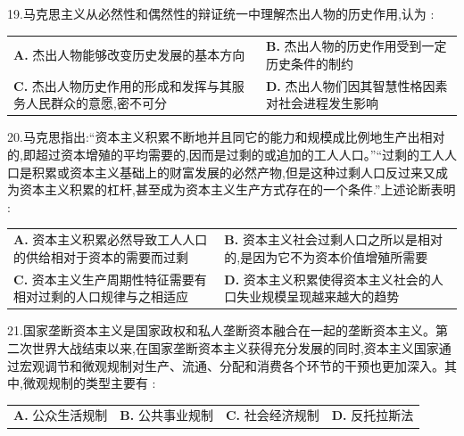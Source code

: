 \documentclass[UTF8,11pt]{ctexart}
\begin{document}
19.马克思主义从必然性和偶然性的辩证统一中理解杰出人物的历史作用,认为 :


\begin{center}\begin{tabular}{>{\raggedright\arraybackslash}p{\dimexpr(\linewidth-4\tabcolsep)/2\relax}>{\raggedright\arraybackslash}p{\dimexpr(\linewidth-4\tabcolsep)/2\relax}}
\textbf{A.} 杰出人物能够改变历史发展的基本方向 & \textbf{B.} 杰出人物的历史作用受到一定历史条件的制约\\[.35em]
\textbf{C.} 杰出人物历史作用的形成和发挥与其服务人民群众的意愿,密不可分 & \textbf{D.} 杰出人物们因其智慧性格因素对社会进程发生影响\\[.35em]\end{tabular}\end{center}

20.马克思指出:“资本主义积累不断地并且同它的能力和规模成比例地生产出相对的,即超过资本增殖的平均需要的,因而是过剩的或追加的工人人口。”“过剩的工人人口是积累或资本主义基础上的财富发展的必然产物,但是这种过剩人口反过来又成为资本主义积累的杠杆,甚至成为资本主义生产方式存在的一个条件.”上述论断表明 :


\begin{center}\begin{tabular}{>{\raggedright\arraybackslash}p{\dimexpr(\linewidth-4\tabcolsep)/2\relax}>{\raggedright\arraybackslash}p{\dimexpr(\linewidth-4\tabcolsep)/2\relax}}
\textbf{A.} 资本主义积累必然导致工人人口的供给相对于资本的需要而过剩 & \textbf{B.} 资本主义社会过剩人口之所以是相对的,是因为它不为资本价值增殖所需要\\[.35em]
\textbf{C.} 资本主义生产周期性特征需要有相对过剩的人口规律与之相适应 & \textbf{D.} 资本主义积累使得资本主义社会的人口失业规模呈现越来越大的趋势\\[.35em]\end{tabular}\end{center}

21.国家垄断资本主义是国家政权和私人垄断资本融合在一起的垄断资本主义。第二次世界大战结束以来,在国家垄断资本主义获得充分发展的同时,资本主义国家通过宏观调节和微观规制对生产、流通、分配和消费各个环节的干预也更加深入。其中,微观规制的类型主要有 :


\begin{center}\begin{tabular}{>{\raggedright\arraybackslash}p{\dimexpr(\linewidth-8\tabcolsep)/4\relax}>{\raggedright\arraybackslash}p{\dimexpr(\linewidth-8\tabcolsep)/4\relax}>{\raggedright\arraybackslash}p{\dimexpr(\linewidth-8\tabcolsep)/4\relax}>{\raggedright\arraybackslash}p{\dimexpr(\linewidth-8\tabcolsep)/4\relax}}
\textbf{A.} 公众生活规制 & \textbf{B.} 公共事业规制 & \textbf{C.} 社会经济规制 & \textbf{D.} 反托拉斯法\\[.35em]\end{tabular}\end{center}
\end{document}
